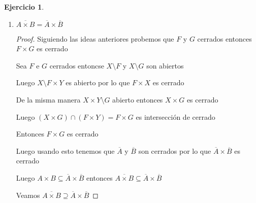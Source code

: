 \documentclass[12pt]{report}
\newcommand{\ol}{\overline}
\newcommand{\open}{\mathrm{o}}
\theoremstyle{definition}
\newtheorem{ej}{Ejercicio}
\begin{document}
\begin{ej}
\begin{enumerate}
\begin{proof}
	Luego $d((x',y')(x,y)) = d_{1}(x',x) + d_{2}(y',y) < \frac{r}{2} + \frac{r}{2} = r$

	entonces $(x',y') \in B_{r}(x,y) \subset A \times B$

	Luego $x' \in A$ y tambien $y' \in B$

	$B(x,\frac{r}{2}) \subseteq A$ y por otro lado $B(y,\frac{r}{2}) \subseteq B$

	Entonces $x \in A^{\open}$ e $y \in B^{\open}$ luego $(x,y) \in A^{\open} \times B^{\open}$  
      \end{proof}
    \item $\ol{A\times B} = \ol{A} \times \ol{B}$
      \begin{proof}
	Siguiendo las ideas anteriores probemos que $F$ y $G$ cerrados entonces $F \times G$ es cerrado

	Sea $F$ e $ G$ cerrados entoncse $X \setminus F$ y $X \setminus G$ son abiertos 

	Luego $X \setminus F \times Y$ es abierto por lo que $F \times X$ es cerrado

	De la misma manera $X \times Y \setminus G$ abierto entonces $X \times G$ es cerrado

	Luego $(X \times G )\cap (F \times Y) = F\times G$ es intersección de cerrado

	Entonces $F \times G$ es cerrado

	Luego usando esto tenemos que $\ol A$ y $\ol B$ son cerrados por lo que $\ol A \times \ol B$ es cerrado

	Luego $A \times B \subseteq \ol A \times \ol B$ entonces $\ol{A \times B} \subseteq \ol A \times \ol B$

	Veamos $\ol{A \times B} \supseteq \ol A \times \ol B$
      \end{proof}
  \end{enumerate}
\end{ej}
\end{document}

